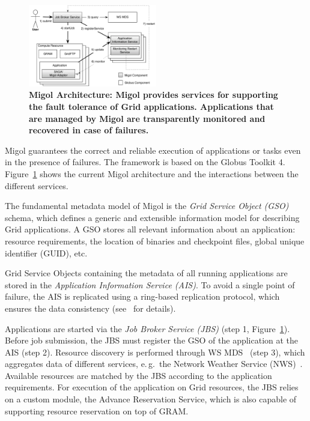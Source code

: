 \documentclass[conference,final]{IEEEtran}
\newcommand{\up}{\vspace*{-1em}}
\begin{document}
\up
\begin{figure}[h]
 \centering
 \includegraphics[width=0.5\textwidth]{migol_architecture}
 \caption{\footnotesize \bf Migol Architecture: Migol provides services for
 supporting the fault tolerance of Grid applications. Applications that are managed by
 Migol are transparently monitored and recovered in case of
 failures.\up\up
 }
 \label{fig:migol_architecture} 
\end{figure}           


Migol guarantees the correct and reliable exe\-cution of applications
or tasks even in the presence of failures. The framework is based on
the Globus Toolkit 4.  Figure~\ref{fig:migol_architecture} shows the
current Migol architecture and the interactions between the different
services.

The fundamental metadata model of Migol is the \emph{Grid Service
  Object (GSO)} schema, which defines a generic and extensible
information model for describing Grid applications.
A GSO stores all relevant information about an application: resource
requirements, the location of binaries and checkpoint files, global
unique identifier (GUID), etc.

Grid Service Objects containing the metadata of all running
applications are stored in the {\em Application Information Service
  (AIS)}.
To avoid a single point of failure, the AIS is replicated using a ring-based
replication protocol, which ensures the data consistency
(see~\cite{Luckow:2008ys} for details).

Applications are started via the {\em Job Broker Service (JBS)}
(step 1, Figure~\ref{fig:migol_architecture}). Before job
submission, the JBS must register the GSO of the application at the
AIS (step 2).  Resource discovery is performed through WS
MDS~\cite{schopf06}  (step 3), which aggregates data of different services,
e.\,g.\ the Network Weather Service (NWS)~\cite{NWS99}.
Available resources are matched by the JBS according to the
application requirements. For execution of the application on
Grid resources, the JBS relies on a custom module, the Advance
Reservation Service, which is also capable of supporting resource reservation
on top of GRAM.
\end{document}
